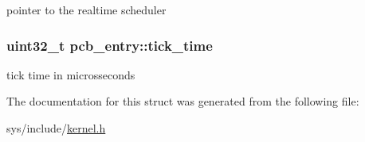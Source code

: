 pointer to the realtime scheduler \hypertarget{structpcb__entry_a998d1bf7b5ac3d6b0b9c4c6c7a0ebec6}{
\subsubsection[{tick\-\_\-time}]{\setlength{\rightskip}{0pt plus 5cm}uint32\-\_\-t pcb\-\_\-entry\-::tick\-\_\-time}}\label{structpcb__entry_a998d1bf7b5ac3d6b0b9c4c6c7a0ebec6}
tick time in microsseconds 

The documentation for this struct was generated from the following file\-:\begin{DoxyCompactItemize}
\item 
sys/include/\hyperlink{kernel_8h}{kernel.\-h}\end{DoxyCompactItemize}
